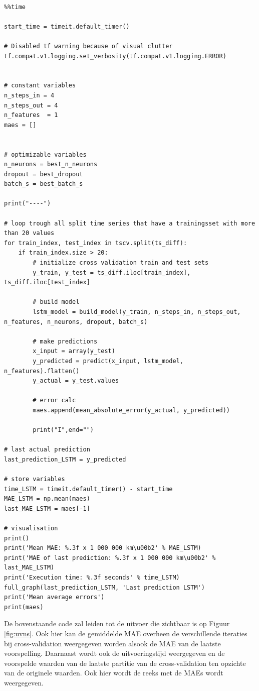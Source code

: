 \begin{verbatim}

%%time

start_time = timeit.default_timer()

# Disabled tf warning because of visual clutter
tf.compat.v1.logging.set_verbosity(tf.compat.v1.logging.ERROR)


# constant variables
n_steps_in = 4
n_steps_out = 4
n_features  = 1
maes = []


# optimizable variables
n_neurons = best_n_neurons
dropout = best_dropout
batch_s = best_batch_s

print("----")

# loop trough all split time series that have a trainingsset with more than 20 values
for train_index, test_index in tscv.split(ts_diff):
    if train_index.size > 20:  
        # initialize cross validation train and test sets
        y_train, y_test = ts_diff.iloc[train_index], ts_diff.iloc[test_index]
        
        # build model
        lstm_model = build_model(y_train, n_steps_in, n_steps_out, n_features, n_neurons, dropout, batch_s)
        
        # make predictions
        x_input = array(y_test)
        y_predicted = predict(x_input, lstm_model, n_features).flatten()
        y_actual = y_test.values
        
        # error calc
        maes.append(mean_absolute_error(y_actual, y_predicted))
        
        print("I",end="")
    
# last actual prediction 
last_prediction_LSTM = y_predicted

# store variables
time_LSTM = timeit.default_timer() - start_time
MAE_LSTM = np.mean(maes)
last_MAE_LSTM = maes[-1]

# visualisation
print()
print('Mean MAE: %.3f x 1 000 000 km\u00b2' % MAE_LSTM)
print('MAE of last prediction: %.3f x 1 000 000 km\u00b2' % last_MAE_LSTM)
print('Execution time: %.3f seconds' % time_LSTM)
full_graph(last_prediction_LSTM, 'Last prediction LSTM')
print('Mean average errors')
print(maes)
\end{verbatim}

De bovenstaande code zal leiden tot de uitvoer die zichtbaar is op Figuur \ref{fig:uvns}. Ook hier kan de gemiddelde MAE overheen de verschillende iteraties bij cross-validation weergegeven worden alsook de MAE van de laatste voorspelling. Daarnaast wordt ook de uitvoeringstijd weergegeven en de voorspelde waarden van de laatste partitie van de cross-validation ten opzichte van de originele waarden. Ook hier wordt de reeks met de MAEs wordt weergegeven.

